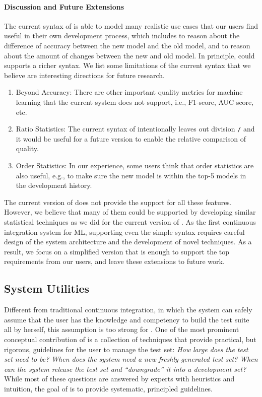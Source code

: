 \documentclass{article}
\begin{document}
\paragraph*{Discussion and Future Extensions}
The current syntax of \sys is able to model 
many realistic use cases that our users find
useful in their own development process, 
which includes to reason about the difference
of accuracy between the new model and the old model,
and to reason about the amount of changes 
between the new and old model. In principle,
\sys could supports a richer syntax.
We list some limitations of the current
syntax that we believe are interesting directions
for future research.
\begin{enumerate}
\item Beyond Accuracy: There are other important
quality metrics for machine learning that the current
system does not support, i.e., F1-score, AUC score, etc.
\item Ratio Statistics: The current syntax of \sys
intentionally leaves out division \texttt{/} and it
would be useful for a future version to enable the 
relative comparison of quality.
\item Order Statistics: In our experience, some users
think that order statistics are also useful, e.g.,
to make sure the new model is within the top-5 models
in the development history.
\end{enumerate}
The current version of \sys does not provide the support
for all these features. However, we believe that many
of them could be supported by developing similar statistical
techniques as we did for the current version of \sys.
As the first continuous integration system for ML,
supporting even the simple syntax requires careful
design of the system architecture and the development
of novel techniques. As a result, we focus on 
a simplified version that is enough to support the 
top requirements from our users, and leave these
extensions to future work.

\subsection{System Utilities}

Different from traditional continuous integration,
in which the system can safely assume that the user
has the knowledge and competency to build the test
suite all by herself, this assumption is too strong
for \sys. One of the most prominent conceptual 
contribution of \sys is a collection of techniques
that provide practical, but rigorous, guidelines 
for the user to manage the test set: {\em How large
does the test set need to be?} {\em When does the system need
a new freshly generated test set?} {\em When can
the system release the test set and ``downgrade''
it into a development set?} While most of these
questions are answered by experts with heuristics
and intuition, the goal of \sys is to provide 
systematic, principled guidelines.
\end{document}
